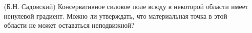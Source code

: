 (Б.Н. Садовский)
Консервативное силовое поле всюду в некоторой области имеет ненулевой
градиент. Можно ли утверждать, что материальная точка в этой области не
может оставаться неподвижной?
